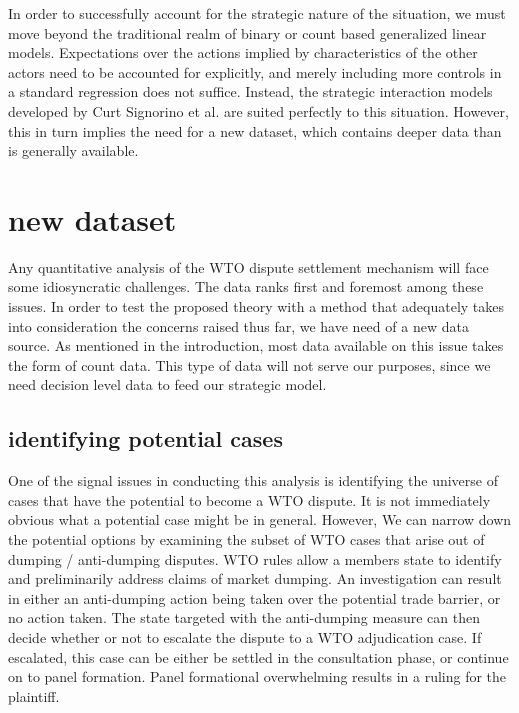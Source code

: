 \documentclass[]{article}
\begin{document}
In order to successfully account for the strategic nature of the situation, we must move beyond the traditional realm of binary or count based generalized linear models. Expectations over the actions implied by characteristics of the other actors need to be accounted for explicitly, and merely including more controls in a standard regression does not suffice. Instead, the strategic interaction models developed by Curt Signorino et al. are suited perfectly to this situation. However, this in turn implies the need for a new dataset, which contains deeper  data than is generally available. 

\section{new dataset}
Any quantitative analysis of the WTO dispute settlement mechanism will face some idiosyncratic challenges. The data ranks first and foremost among these issues.  In order to test the proposed theory with a method that adequately takes into consideration the concerns raised thus far,  we have need of a new data source. As mentioned in the introduction, most data available on this issue takes the form of count data. This type of data will not serve our purposes, since we need decision level data to feed our strategic model.   

\subsection{identifying potential cases}
One  of the signal issues in conducting this analysis is identifying the universe of cases that have the potential to become a WTO dispute. It is not immediately obvious what a potential case might be in general. However, We can narrow down the potential options by examining the subset of WTO cases that arise out of dumping / anti-dumping disputes. WTO rules allow a members state to identify and preliminarily address claims of market dumping. An investigation can result in either an anti-dumping action being taken over the potential trade barrier, or no action taken. The state targeted with the anti-dumping measure can then decide whether or not to escalate the dispute to a WTO adjudication case. If escalated, this case can be either be settled in the consultation phase, or continue on to panel formation. Panel formational overwhelming results in a ruling for the plaintiff. \\
\end{document}
